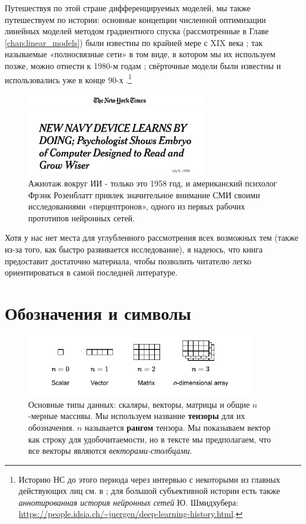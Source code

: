 Путешествуя по этой стране дифференцируемых моделей, мы также путешествуем по истории: основные концепции численной оптимизации линейных моделей методом градиентного спуска (рассмотренные в Главе \ref{chap:linear_models}) были известны по крайней мере с XIX века \cite{stigler1981gauss}; так называемые «полносвязные сети» в том виде, в котором мы их используем позже, можно отнести к 1980-м годам \cite{rumelhart1986general}; свёрточные модели были известны и использовались уже в конце 90-х \cite{lecun1998gradient}.\footnote{Историю НС до этого периода через интервью с некоторыми из главных действующих лиц см. в \cite{anderson2000talking}; для большой субъективной истории есть также \textit{аннотированная история нейронных сетей} Ю. Шмидхубера: \url{https://people.idsia.ch/~juergen/deep-learning-history.html}.}

\begin{figure}
    \centering
    \includegraphics[width=0.7\textwidth]{images/Rosenblatt_cut.jpg}
    \caption*{Ажиотаж вокруг ИИ - только это 1958 год, и американский психолог Фрэнк Розенблатт привлек значительное внимание СМИ своими исследованиями «перцептронов», одного из первых рабочих прототипов нейронных сетей.}
\end{figure}

Хотя у нас нет места для углубленного рассмотрения всех возможных тем (также из-за того, как быстро развивается исследование), я надеюсь, что книга предоставит достаточно материала, чтобы позволить читателю легко ориентироваться в самой последней литературе.

\section*{Обозначения и символы}
\label{sec:notation}

\begin{figure}
    \centering
    \includegraphics[width=0.9\textwidth]{images/Tensors.pdf}
    \caption*{Основные типы данных: скаляры, векторы, матрицы и общие $n$-мерные массивы. Мы используем название \textbf{тензоры} для их обозначения. $n$ называется \textbf{рангом} тензора. Мы показываем вектор как строку для удобочитаемости, но в тексте мы предполагаем, что все векторы являются \textit{векторами-столбцами}.}
\end{figure}

